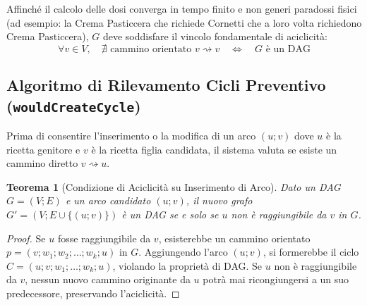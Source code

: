 \documentclass[11pt,a4paper,titlepage]{article}
\newtheorem{theorem}{Teorema}
\begin{document}
Affinch\'e il calcolo delle dosi converga in tempo finito e non generi paradossi fisici (ad esempio: la Crema Pasticcera che richiede Cornetti che a loro volta richiedono Crema Pasticcera), $G$ deve soddisfare il vincolo fondamentale di aciclicit\`a:
$$\forall v \in V, \quad \nexists \text{ cammino orientato } v \rightsquigarrow v \quad \iff \quad G \text{ \`e un DAG}$$

\subsection{Algoritmo di Rilevamento Cicli Preventivo (\texttt{wouldCreateCycle})}
Prima di consentire l'inserimento o la modifica di un arco $(u; v)$ dove $u$ \`e la ricetta genitore e $v$ \`e la ricetta figlia candidata, il sistema valuta se esiste un cammino diretto $v \rightsquigarrow u$.

\begin{theorem}[Condizione di Aciclicit\`a su Inserimento di Arco]
Dato un DAG $G = (V; E)$ e un arco candidato $(u; v)$, il nuovo grafo $G' = (V; E \cup \{(u; v)\})$ \`e un DAG se e solo se $u$ non \`e raggiungibile da $v$ in $G$.
\end{theorem}
\begin{proof}
Se $u$ fosse raggiungibile da $v$, esisterebbe un cammino orientato $p = (v; w_1; w_2; \dots; w_k; u)$ in $G$. Aggiungendo l'arco $(u; v)$, si formerebbe il ciclo $C = (u; v; w_1; \dots; w_k; u)$, violando la propriet\`a di DAG. Se $u$ non \`e raggiungibile da $v$, nessun nuovo cammino originante da $u$ potr\`a mai ricongiungersi a un suo predecessore, preservando l'aciclicit\`a.
\end{proof}
\end{document}
